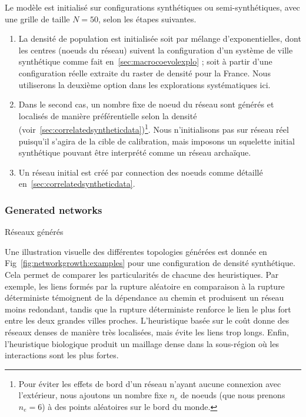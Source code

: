 Le modèle est initialisé sur configurations synthétiques ou semi-synthétiques, avec une grille de taille $N=50$, selon les étapes suivantes.
\begin{enumerate}
	\item La densité de population est initialisée soit par mélange d'exponentielles, dont les centres (noeuds du réseau) suivent la configuration d'un système de ville synthétique comme fait en~\ref{sec:macrocoevolexplo} ; soit à partir d'une configuration réelle extraite du raster de densité pour la France. Nous utiliserons la deuxième option dans les explorations systématiques ici.
	\item Dans le second cas, un nombre fixe de noeud du réseau sont générés et localisés de manière préférentielle selon la densité (voir~\ref{sec:correlatedsyntheticdata})\footnote{Pour éviter les effets de bord d'un réseau n'ayant aucune connexion avec l'extérieur, nous ajoutons un nombre fixe $n_e$ de noeuds (que nous prenons $n_e = 6$) à des points aléatoires sur le bord du monde.}. Nous n'initialisons pas sur réseau réel puisqu'il s'agira de la cible de calibration, mais imposons un squelette initial synthétique pouvant être interprété comme un réseau archaïque.
	\item Un réseau initial est créé par connection des noeuds comme détaillé en~\ref{sec:correlatedsyntheticdata}.
\end{enumerate}


\subsubsection{Generated networks}{Réseaux générés}

Une illustration visuelle des différentes topologies générées est donnée en Fig~\ref{fig:networkgrowth:examples} pour une configuration de densité synthétique. Cela permet de comparer les particularités de chacune des heuristiques. Par exemple, les liens formés par la rupture aléatoire en comparaison à la rupture déterministe témoignent de la dépendance au chemin et produisent un réseau moins redondant, tandis que la rupture déterministe renforce le lien le plus fort entre les deux grandes villes proches. L'heuristique basée sur le coût donne des réseaux denses de manière très localisées, mais évite les liens trop longs. Enfin, l'heuristique biologique produit un maillage dense dans la sous-région où les interactions sont les plus fortes.



